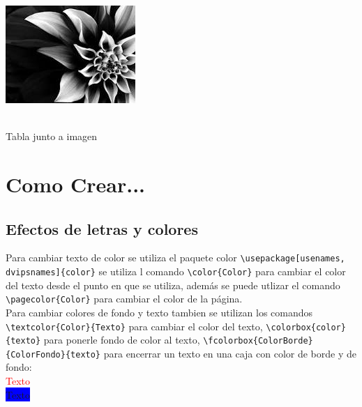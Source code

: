 \documentclass[10pt,journal,compsoc]{IEEEtran}
\begin{document}
\begin{minipage}{0.2\textwidth}
	\includegraphics[width=\textwidth]{pic1.jpg}
\end{minipage}\\
\newline
Tabla junto a imagen\\


\section{Como Crear...}
\subsection{Efectos de letras y colores}
Para cambiar texto de color se utiliza el paquete color \verb|\usepackage[usenames, dvipsnames]{color}| se utiliza l comando \verb|\color{Color}| para cambiar el color del texto desde el punto en que se utiliza, adem\'as se puede utlizar el comando \verb|\pagecolor{Color}| para cambiar el color de la p\'agina.\\
Para cambiar colores de fondo y texto tambien se utilizan los comandos \verb|\textcolor{Color}{Texto}| para cambiar el color del texto, \verb|\colorbox{color}{texto}| para ponerle fondo de color al texto, \verb|\fcolorbox{ColorBorde}{ColorFondo}{texto}| para encerrar un texto en una caja con color de borde y de fondo:\\
\textcolor{red}{Texto}\\\newline
\colorbox{blue}{Texto}\\\newline
{}\\\newline
\end{document}
